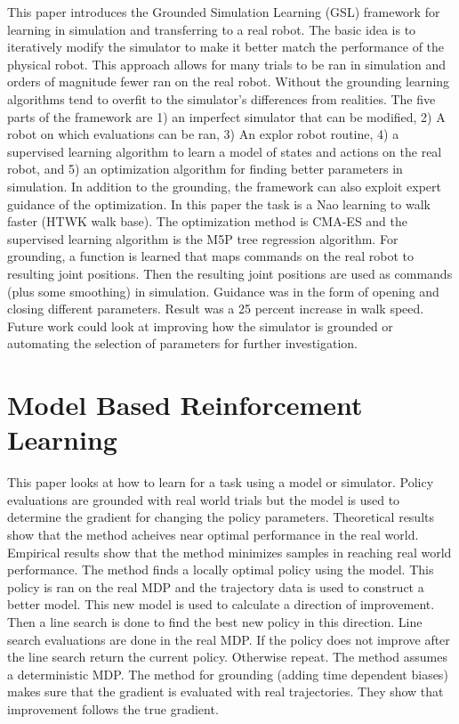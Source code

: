 \documentclass[12 pt]{article}
\begin{document}
This paper introduces the Grounded Simulation Learning (GSL) framework for learning in simulation and transferring to a real robot. The basic idea is to iteratively modify the simulator to make it better match the performance of the physical robot. This approach allows for many trials to be ran in simulation and orders of magnitude fewer ran on the real robot. Without the grounding learning algorithms tend to overfit to the simulator's differences from realities. The five parts of the framework are 1) an imperfect simulator that can be modified, 2) A robot on which evaluations can be ran, 3) An explor robot routine, 4) a supervised learning algorithm to learn a model of states and actions on the real robot, and 5) an optimization algorithm for finding better parameters in simulation. In addition to the grounding, the framework can also exploit expert guidance of the optimization. In this paper the task is a Nao learning to walk faster (HTWK walk base). The optimization method is CMA-ES and the supervised learning algorithm is the M5P tree regression algorithm. For grounding, a function is learned that maps commands on the real robot to resulting joint positions. Then the resulting joint positions are used as commands (plus some smoothing) in simulation. Guidance was in the form of opening and closing different parameters. Result was a 25 percent increase in walk speed. Future work could look at improving how the simulator is grounded or automating the selection of parameters for further investigation.\cite{farchy2013humanoid}

\section{Model Based Reinforcement Learning}

This paper looks at how to learn for a task using a model or simulator. Policy evaluations are grounded with real world trials but the model is used to determine the gradient for changing the policy parameters. Theoretical results show that the method acheives near optimal performance in the real world. Empirical results show that the method minimizes samples in reaching real world performance. The method finds a locally optimal policy using the model. This policy is ran on the real MDP and the trajectory data is used to construct a better model. This new model is used to calculate a direction of improvement. Then a line search is done to find the best new policy in this direction. Line search evaluations are done in the real MDP. If the policy does not improve after the line search return the current policy. Otherwise repeat. The method assumes a deterministic MDP. The method for grounding (adding time dependent biases) makes sure that the gradient is evaluated with real trajectories. They show that improvement follows the true gradient. \cite{abbeel2006using}
\end{document}
